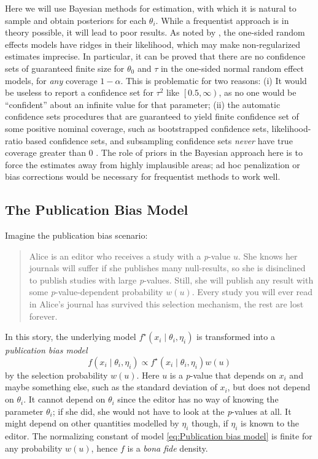 \documentclass{article}
\theoremstyle{plain}
\theoremstyle{definition}
\begin{document}
Here we will use Bayesian methods for estimation, with which it is natural to sample and obtain posteriors for each $\theta_{i}$. While a frequentist approach is in theory possible, it will lead to poor results. As noted by \citet[Appendix, 1]{mcshane2016adjusting}, the one-sided random effects models have ridges in their likelihood, which may make non-regularized estimates imprecise. In particular, it can be proved \citep{Moss2019} that there are no confidence sets of guaranteed finite size for $\theta_{0}$ and $\tau$ in the one-sided normal random effect models, for \emph{any} coverage $1-\alpha$. This is problematic for two reasons: (i) It would be useless to report a confidence set for $\tau^{2}$ like $\left[0.5,\infty\right)$, as no one would be ``confident'' about an infinite value for that parameter; (ii) the automatic confidence sets procedures that are guaranteed to yield finite confidence set of some positive nominal coverage, such as bootstrapped confidence sets, likelihood-ratio based confidence sets, and subsampling confidence sets \emph{never} have true coverage greater than $0$ \citep[see][]{gleser996bootstrap, Moss2019}. The role of priors in the Bayesian approach here is to force the estimates away from highly implausible areas; ad hoc penalization or bias corrections would be necessary for frequentist methods to work well.



\subsection{The Publication Bias Model} \label{subsect:publicationBias}

Imagine the publication bias scenario:
\begin{quote}
Alice is an editor who receives a study with a \emph{p}-value $u$. She knows her journals will suffer if she publishes many null-results, so she is disinclined to publish studies with large \emph{p}-values. Still, she will publish any result with some \emph{p}-value-dependent probability $w\left(u\right)$. Every study you will ever read in Alice's journal has survived this selection mechanism, the rest are lost forever.
\end{quote}
In this story, the underlying model $f^{\star}\left(x_{i}\mid\theta_{i},\eta_{i}\right)$
is transformed into a \emph{publication bias model}
\begin{equation}
f\left(x_{i}\mid\theta_{i},\eta_{i}\right)\propto f^{\star}\left(x_{i}\mid\theta_{i},\eta_{i}\right)w\left(u\right)\label{eq:Publication bias model}
\end{equation}
by the selection probability $w\left(u\right)$. Here $u$ is a \emph{p}-value that depends on $x_{i}$ and maybe something else, such as the standard deviation of $x_{i}$, but does not depend on $\theta_{i}$. It cannot depend on $\theta_{i}$ since the editor has no way of knowing the parameter $\theta_{i}$; if she did, she would not have to look at the \emph{p}-values at all. It might depend on other quantities modelled by $\eta_{i}$ though, if $\eta_{i}$ is known to the editor. The normalizing constant of model \eqref{eq:Publication bias model} is finite for any probability $w(u)$, hence $f$ is a \emph{bona fide} density.
\end{document}
